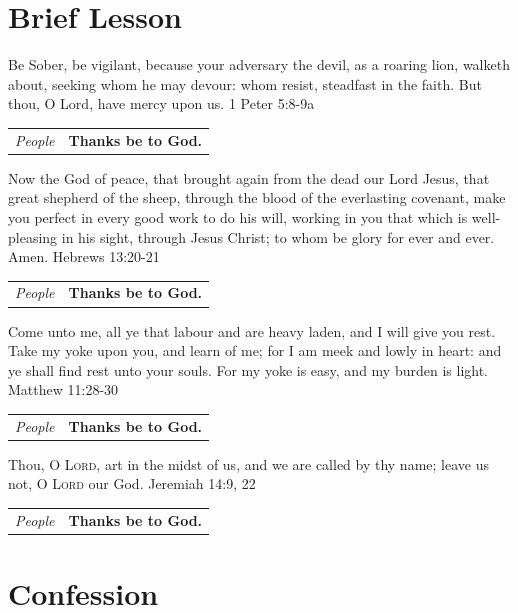 \documentclass{article}
\begin{document}
\section*{Brief Lesson}


\bibleverse
{Be Sober, be vigilant, because your adversary the devil, as a
  roaring lion, walketh about, seeking whom he may devour: whom resist,
steadfast in the faith. But thou, O Lord, have mercy upon us.}
{1 Peter 5:8-9a}

\begin{tabularx}{\linewidth}{lX}
  \textit{People} & \textbf{Thanks be to God.}
\end{tabularx}


\bibleverse
{Now the God of peace, that brought again from the dead our Lord Jesus,
  that great shepherd of the sheep, through the blood of the
  everlasting covenant,
  make you perfect in every good work to do his will, working in you that
  which is well-pleasing in his sight, through Jesus Christ; to whom be
glory for ever and ever. Amen.}
{Hebrews 13:20-21}

\begin{tabularx}{\linewidth}{lX}
  \textit{People} & \textbf{Thanks be to God.}
\end{tabularx}


\bibleverse
{Come unto me, all ye that labour and are heavy laden, and I will give you
  rest. Take my yoke upon you, and learn of me; for I am meek and
  lowly in heart: and ye shall find rest unto your souls.
For my yoke is easy, and my burden is light.}
{Matthew 11:28-30}

\begin{tabularx}{\linewidth}{lX}
  \textit{People} & \textbf{Thanks be to God.}
\end{tabularx}


\bibleverse
{Thou, O \textsc{Lord}, art in the midst of us, and we are called by
thy name; leave us not, O \textsc{Lord} our God.}
{Jeremiah 14:9, 22}

\begin{tabularx}{\linewidth}{lX}
  \textit{People} & \textbf{Thanks be to God.}
\end{tabularx}

\section*{Confession}
\end{document}

